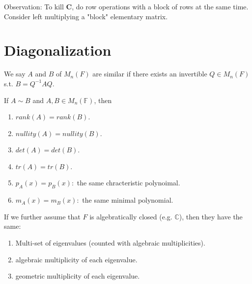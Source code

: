 \documentclass[12pt]{article}
\begin{document}
\begin{pfbox}
    Observation: To kill $\textbf{C}$, do row operations with a block of rows at the same time.
    Consider left multiplying a "block" elementary matrix.
\end{pfbox}

\newpage
\section{Diagonalization}

\begin{definition}
    We say $A$ and $B$ of $M_n(F)$ are similar if there exists an invertible $Q\in M_n(F)$ s.t. $B=Q^{-1}AQ$.
\end{definition}


\begin{theorem}
    If $A\sim B$ and $A,B\in M_n(\mathbb{F})$, then
    \begin{enumerate}
        \item $rank(A)=rank(B)$.
        \item $nullity(A)=nullity(B)$.
        \item $det(A)=det(B)$.
        \item $tr(A)=tr(B)$.
        \item $p_A(x)=p_B(x):$ the same chracteristic polynoimal.
        \item $m_A(x)=m_B(x):$ the same minimal polynomial.
    \end{enumerate}

    If we further assume that $F$ is algebratically closed (e.g. $\mathbb{C}$), then they have the same:
    \begin{enumerate}
        \item Multi-set of eigenvalues (counted with algebraic multiplicities).
        \item algebraic multiplicity of each eigenvalue.
        \item geometric multiplicity of each eigenvalue.
    \end{enumerate}
\end{theorem}
\end{document}
